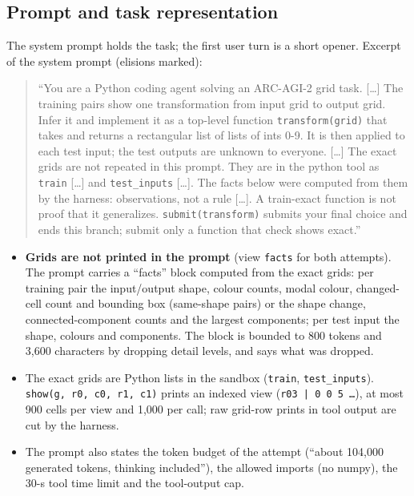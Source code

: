 \subsection{Prompt and task representation}
The system prompt holds the task; the first user turn is a short opener. Excerpt of the system prompt (elisions marked):
\begin{quote}\small
``You are a Python coding agent solving an ARC-AGI-2 grid task. [\dots] The training pairs show one transformation from input grid to output grid. Infer it and implement it as a top-level function \texttt{transform(grid)} that takes and returns a rectangular list of lists of ints 0-9. It is then applied to each test input; the test outputs are unknown to everyone. [\dots] The exact grids are not repeated in this prompt. They are in the python tool as \texttt{train} [\dots] and \texttt{test\_inputs} [\dots]. The facts below were computed from them by the harness: observations, not a rule [\dots]. A train-exact function is not proof that it generalizes. \texttt{submit(transform)} submits your final choice and ends this branch; submit only a function that check shows exact.''
\end{quote}
\begin{itemize}[leftmargin=*,itemsep=1pt]
\item \textbf{Grids are not printed in the prompt} (view \texttt{facts} for both attempts). The prompt carries a ``facts'' block computed from the exact grids: per training pair the input/output shape, colour counts, modal colour, changed-cell count and bounding box (same-shape pairs) or the shape change, connected-component counts and the largest components; per test input the shape, colours and components. The block is bounded to 800 tokens and 3{,}600 characters by dropping detail levels, and says what was dropped.
\item The exact grids are Python lists in the sandbox (\texttt{train}, \texttt{test\_inputs}). \texttt{show(g, r0, c0, r1, c1)} prints an indexed view (\texttt{r03 | 0 0 5 \dots}), at most 900 cells per view and 1{,}000 per call; raw grid-row prints in tool output are cut by the harness.
\item The prompt also states the token budget of the attempt (``about 104,000 generated tokens, thinking included''), the allowed imports (no numpy), the 30-s tool time limit and the tool-output cap.
\end{itemize}

